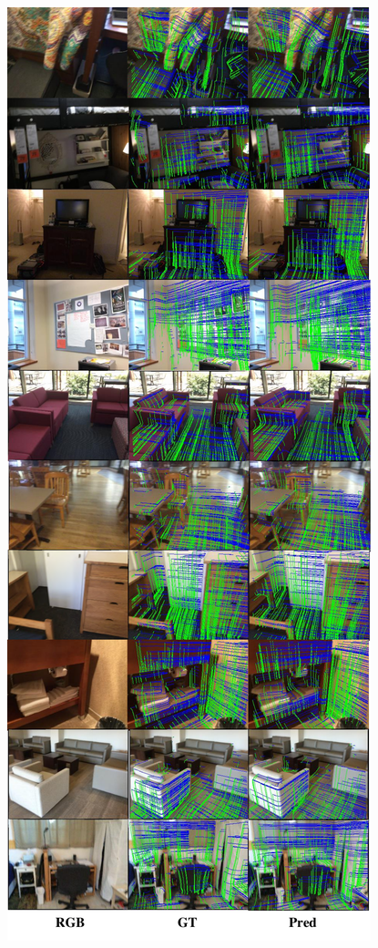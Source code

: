 \begin{figure}
\begin{minipage}{0.49\linewidth}
    \centering
    \includegraphics[width=0.95\linewidth]{FrameNet/graph/vis-supplemental.pdf}

\end{minipage}
\end{figure}
